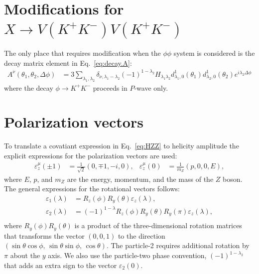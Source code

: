 \documentclass[prd,preprintnumbers,floatfix,
nofootinbib,superscriptaddress]{revtex4}
\begin{document}
\appendix

\section{Modifications for $X\to V(K^+K^-)V(K^+K^-)$} \label{sec:KKKK}

The only place that requires modification when the $\phi\phi$ system is considered
is the decay matrix element in Eq.~\eqref{eq:decay.A}:
\begin{align}
  A^{\nu}(\theta_1,\theta_2,\Delta\phi) &= 3
  \sum_{\lambda_1,\lambda_2}
  \delta_{\nu,\lambda_1-\lambda_2} (-1)^{1-\lambda_2}
  H_{\lambda_1\lambda_2}
  d_{\lambda_1,0}^{1}(\theta_1) d_{\lambda_2,0}^{1}(\theta_2)
  e^{i\lambda_2 \Delta\phi}
\end{align}
where the decay $\phi\to K^+K^-$ proceeds in $P$-wave only.

\section{Polarization vectors} \label{sec:polarisation.vectors}

To translate a covatiant expression in Eq.~\eqref{eq:HZZ} to helicity amplitude
the explicit expressions for the polarization vectors are used:
\begin{align}
  \varepsilon_z^{\mu}(\pm1) &= \frac{1}{\sqrt{2}} \left( 0,\mp 1,-i,0 \right), &
  \varepsilon_z^{\mu}(0) &= \frac{1}{m_Z} \left(p,0,0,E\right),
\end{align}
where $E$, $p$, and $m_Z$ are the energy, momentum, and the mass of the $Z$ boson.
The general expressions for the rotational vectors follows:
\begin{align}
  \varepsilon_1(\lambda) &= R_z(\phi) R_y(\theta) \varepsilon_z(\lambda),\\
  \varepsilon_2(\lambda) &= (-1)^{1-\lambda} R_z(\phi) R_y(\theta) R_y(\pi) \varepsilon_z(\lambda),\\
\end{align}
where $R_y(\phi)R_y(\theta)$ is a product of the three-dimensional rotation matrices
that transforms the vector $(0,0,1)$ to the direction $(\sin\theta\cos\phi,\,\sin\theta\sin\phi,\,\cos\theta)$.
The particle-2 requires additional rotation by $\pi$ about the $y$ axis. We also use the particle-two phase convention,
$(-1)^{1-\lambda_2}$ that adds an extra sign to the vector $\varepsilon_2(0)$.
\end{document}
